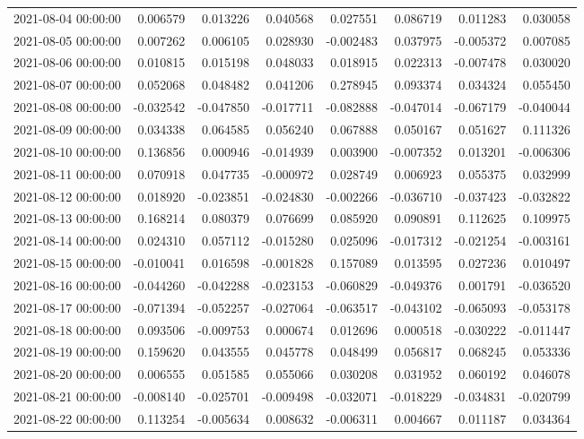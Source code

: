 \begin{tabular}{lrrrrrrr}
2021-08-04 00:00:00 & 0.006579 & 0.013226 & 0.040568 & 0.027551 & 0.086719 & 0.011283 & 0.030058 \\
2021-08-05 00:00:00 & 0.007262 & 0.006105 & 0.028930 & -0.002483 & 0.037975 & -0.005372 & 0.007085 \\
2021-08-06 00:00:00 & 0.010815 & 0.015198 & 0.048033 & 0.018915 & 0.022313 & -0.007478 & 0.030020 \\
2021-08-07 00:00:00 & 0.052068 & 0.048482 & 0.041206 & 0.278945 & 0.093374 & 0.034324 & 0.055450 \\
2021-08-08 00:00:00 & -0.032542 & -0.047850 & -0.017711 & -0.082888 & -0.047014 & -0.067179 & -0.040044 \\
2021-08-09 00:00:00 & 0.034338 & 0.064585 & 0.056240 & 0.067888 & 0.050167 & 0.051627 & 0.111326 \\
2021-08-10 00:00:00 & 0.136856 & 0.000946 & -0.014939 & 0.003900 & -0.007352 & 0.013201 & -0.006306 \\
2021-08-11 00:00:00 & 0.070918 & 0.047735 & -0.000972 & 0.028749 & 0.006923 & 0.055375 & 0.032999 \\
2021-08-12 00:00:00 & 0.018920 & -0.023851 & -0.024830 & -0.002266 & -0.036710 & -0.037423 & -0.032822 \\
2021-08-13 00:00:00 & 0.168214 & 0.080379 & 0.076699 & 0.085920 & 0.090891 & 0.112625 & 0.109975 \\
2021-08-14 00:00:00 & 0.024310 & 0.057112 & -0.015280 & 0.025096 & -0.017312 & -0.021254 & -0.003161 \\
2021-08-15 00:00:00 & -0.010041 & 0.016598 & -0.001828 & 0.157089 & 0.013595 & 0.027236 & 0.010497 \\
2021-08-16 00:00:00 & -0.044260 & -0.042288 & -0.023153 & -0.060829 & -0.049376 & 0.001791 & -0.036520 \\
2021-08-17 00:00:00 & -0.071394 & -0.052257 & -0.027064 & -0.063517 & -0.043102 & -0.065093 & -0.053178 \\
2021-08-18 00:00:00 & 0.093506 & -0.009753 & 0.000674 & 0.012696 & 0.000518 & -0.030222 & -0.011447 \\
2021-08-19 00:00:00 & 0.159620 & 0.043555 & 0.045778 & 0.048499 & 0.056817 & 0.068245 & 0.053336 \\
2021-08-20 00:00:00 & 0.006555 & 0.051585 & 0.055066 & 0.030208 & 0.031952 & 0.060192 & 0.046078 \\
2021-08-21 00:00:00 & -0.008140 & -0.025701 & -0.009498 & -0.032071 & -0.018229 & -0.034831 & -0.020799 \\
2021-08-22 00:00:00 & 0.113254 & -0.005634 & 0.008632 & -0.006311 & 0.004667 & 0.011187 & 0.034364 \\

\end{tabular}
